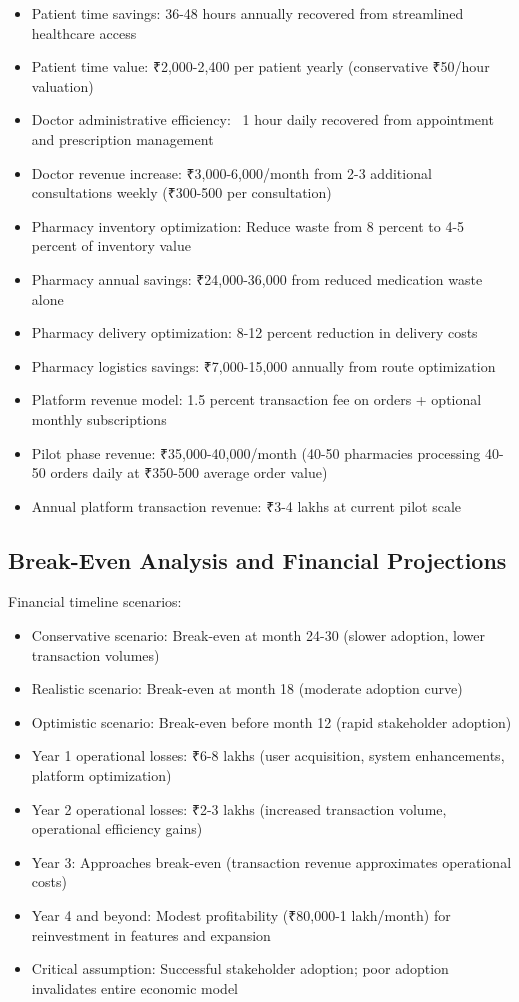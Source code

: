 \documentclass[12pt,a4paper]{report}
\begin{document}
\begin{itemize}
  \item Patient time savings: 36-48 hours annually recovered from streamlined healthcare access
  \item Patient time value: ₹2,000-2,400 per patient yearly (conservative ₹50/hour valuation)
  \item Doctor administrative efficiency: ~1 hour daily recovered from appointment and prescription management
  \item Doctor revenue increase: ₹3,000-6,000/month from 2-3 additional consultations weekly (₹300-500 per consultation)
  \item Pharmacy inventory optimization: Reduce waste from 8 percent to 4-5 percent of inventory value
  \item Pharmacy annual savings: ₹24,000-36,000 from reduced medication waste alone
  \item Pharmacy delivery optimization: 8-12 percent reduction in delivery costs
  \item Pharmacy logistics savings: ₹7,000-15,000 annually from route optimization
  \item Platform revenue model: 1.5 percent transaction fee on orders + optional monthly subscriptions
  \item Pilot phase revenue: ₹35,000-40,000/month (40-50 pharmacies processing 40-50 orders daily at ₹350-500 average order value)
  \item Annual platform transaction revenue: ₹3-4 lakhs at current pilot scale
\end{itemize}

\subsection{Break-Even Analysis and Financial Projections}

Financial timeline scenarios:

\begin{itemize}
  \item Conservative scenario: Break-even at month 24-30 (slower adoption, lower transaction volumes)
  \item Realistic scenario: Break-even at month 18 (moderate adoption curve)
  \item Optimistic scenario: Break-even before month 12 (rapid stakeholder adoption)
  \item Year 1 operational losses: ₹6-8 lakhs (user acquisition, system enhancements, platform optimization)
  \item Year 2 operational losses: ₹2-3 lakhs (increased transaction volume, operational efficiency gains)
  \item Year 3: Approaches break-even (transaction revenue approximates operational costs)
  \item Year 4 and beyond: Modest profitability (₹80,000-1 lakh/month) for reinvestment in features and expansion
  \item Critical assumption: Successful stakeholder adoption; poor adoption invalidates entire economic model
\end{itemize}
\end{document}
